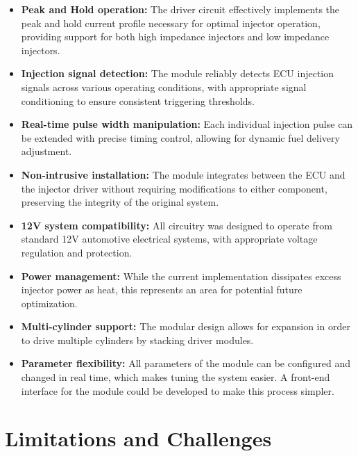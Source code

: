         \begin{itemize}
            \item \textbf{Peak and Hold operation:} The driver circuit effectively implements the peak and hold current profile necessary for optimal injector operation, providing support for both high impedance injectors and low impedance injectors.
            
            \item \textbf{Injection signal detection:} The module reliably detects ECU injection signals across various operating conditions, with appropriate signal conditioning to ensure consistent triggering thresholds.
            
            \item \textbf{Real-time pulse width manipulation:} Each individual injection pulse can be extended with precise timing control, allowing for dynamic fuel delivery adjustment.
            
            \item \textbf{Non-intrusive installation:} The module integrates between the ECU and the injector driver without requiring modifications to either component, preserving the integrity of the original system.
            
            \item \textbf{12V system compatibility:} All circuitry was designed to operate from standard 12V automotive electrical systems, with appropriate voltage regulation and protection.
            
            \item \textbf{Power management:} While the current implementation dissipates excess injector power as heat, this represents an area for potential future optimization.
            
            \item \textbf{Multi-cylinder support:} The modular design allows for expansion in order to drive multiple cylinders by stacking driver modules.
            
            \item \textbf{Parameter flexibility:} All parameters of the module can be configured and changed in real time, which makes tuning the system easier. A front-end interface for the module could be developed to make this process simpler.
        \end{itemize}

    \section{Limitations and Challenges}


